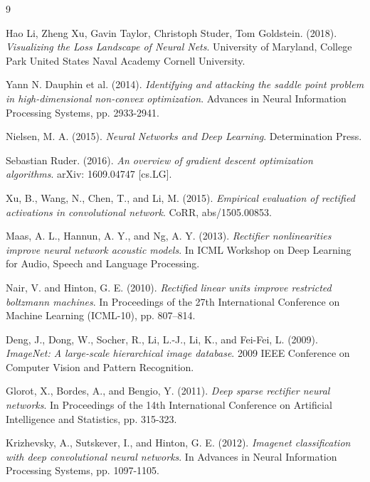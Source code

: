 

\begin{thebibliography}{9}

Hao Li, Zheng Xu, Gavin Taylor, Christoph Studer, Tom Goldstein. (2018).
\textit{Visualizing the Loss Landscape of Neural Nets}.
University of Maryland, College Park United States Naval Academy Cornell University.

Yann N. Dauphin et al. (2014).
\textit{Identifying and attacking the saddle point problem in high-dimensional non-convex optimization}.
Advances in Neural Information Processing Systems, pp. 2933-2941.

Nielsen, M. A. (2015).
\textit{Neural Networks and Deep Learning}.
Determination Press.

Sebastian Ruder. (2016).
\textit{An overview of gradient descent optimization algorithms}.
arXiv: 1609.04747 [cs.LG].

Xu, B., Wang, N., Chen, T., and Li, M. (2015).
\textit{Empirical evaluation of rectified activations in convolutional network}.
CoRR, abs/1505.00853.

Maas, A. L., Hannun, A. Y., and Ng, A. Y. (2013).
\textit{Rectifier nonlinearities improve neural network acoustic models}.
In ICML Workshop on Deep Learning for Audio, Speech and Language Processing.

Nair, V. and Hinton, G. E. (2010).
\textit{Rectified linear units improve restricted boltzmann machines}.
In Proceedings of the 27th International Conference on Machine Learning (ICML-10), pp. 807–814.

Deng, J., Dong, W., Socher, R., Li, L.-J., Li, K., and Fei-Fei, L. (2009).
\textit{ImageNet: A large-scale hierarchical image database}.
2009 IEEE Conference on Computer Vision and Pattern Recognition.

Glorot, X., Bordes, A., and Bengio, Y. (2011).
\textit{Deep sparse rectifier neural networks}.
In Proceedings of the 14th International Conference on Artificial Intelligence and Statistics, pp. 315-323.

Krizhevsky, A., Sutskever, I., and Hinton, G. E. (2012).
\textit{Imagenet classification with deep convolutional neural networks}.
In Advances in Neural Information Processing Systems, pp. 1097-1105.


\end{thebibliography}
